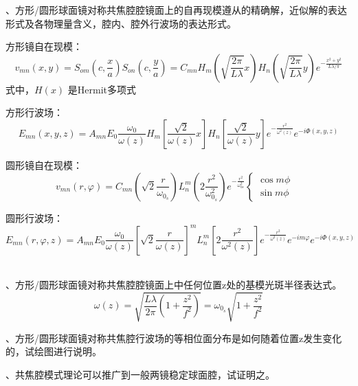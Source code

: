 \documentclass[12pt]{article}
\begin{document}
{、方形/圆形球面镜对称共焦腔腔镜面上的自再现模遵从的精确解，近似解的表达形式及各物理量含义，腔内、腔外行波场的表达形式。
}
{\kaishu
\par 方形镜自在现模：
\begin{equation*}
	v_{mn}(x,y)
	=
	S_{om}\left(c,\frac{x}{a} \right)
	S_{on}\left( c,\frac{y}{a} \right)
	=C_{mn}
	H_m \left( \sqrt{\frac{2\pi}{L\lambda} }x \right)
	H_n \left( \sqrt{\frac{2\pi}{L\lambda} } y\right)
	e^{-\frac{x^2+y^2}{L\lambda/\pi} }
\end{equation*}
式中，$H(x)$ 是Hermit多项式
\par 方形行波场：
\begin{equation*}
	E_{mn}(x,y,z)=A_{mn}E_0 \frac{\omega_0}{\omega(z)} 
	H_m \left[ \frac{\sqrt2}{\omega(z)} x \right]
	H_n \left[ \frac{\sqrt2}{\omega(z)} y \right]
	e^{-\frac{r^2}{\omega^2(z)} }
	e^{-i\Phi(x,y,z)}
\end{equation*}
\par 圆形镜自在现模：
\begin{equation*}
	v_{mn}(r,\varphi)
	=C_{mn}\left( \sqrt{2}\frac{r}{\omega_{0_s}}  \right)
	 L_n^m \left( 2 \frac{r^2}{\omega_{0_s}^2}  \right)
	 e^{-\frac{r^2}{\omega_{0s}^2} } 
	\begin{cases}
		\cos m\phi &\\
		\sin m\phi
	\end{cases}
\end{equation*}
\par 圆形行波场：
\begin{equation*}
	E_{mn}(r,\varphi,z)=A_{mn}E_0 \frac{\omega_0}{\omega(z)} 
	\left[ \sqrt2 \frac{r}{\omega(z)}  \right]^m
	L_n^m \left[ 2 \frac{r^2}{\omega^2(z)}  \right]
	e^{-\frac{r^2}{\omega^2(z)}} e^{-im\varphi} e^{-i\Phi(x,y,z)}
\end{equation*}
\\}

{、方形/圆形球面镜对称共焦腔腔镜面上中任何位置z处的基模光斑半径表达式。
}
\begin{equation*}
	\omega(z)=
	\sqrt{\frac{L\lambda}{2\pi} \left( 1+ \frac{z^2}{f^2}  \right)} 
	= \omega_{0_s}\sqrt{1+\frac{z^2}{f^2} }
\end{equation*}

{、方形/圆形球面镜对称共焦腔行波场的等相位面分布是如何随着位置z发生变化的，试绘图进行说明。
}

{、共焦腔模式理论可以推广到一般两镜稳定球面腔，试证明之。
}
\end{document}
